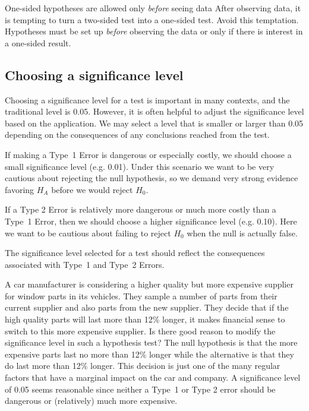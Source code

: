 \begin{caution}{One-sided hypotheses are allowed only \emph{before} seeing data}
{After observing data, it is tempting to turn a two-sided test into a one-sided test. Avoid this temptation. Hypotheses must be set up \emph{before} observing the data or only if there is interest in a one-sided result.}
\end{caution}


\subsection{Choosing a significance level}
\label{significanceLevel}


Choosing a significance level for a test is important in many contexts, and the traditional level is 0.05. However, it is often helpful to adjust the significance level based on the application. We may select a level that is smaller or larger than 0.05 depending on the consequences of any conclusions reached from the test.

If making a Type~1 Error is dangerous or especially costly, we should choose a small significance level (e.g. 0.01). Under this scenario we want to be very cautious about rejecting the null hypothesis, so we demand very strong evidence favoring $H_A$ before we would reject $H_0$.

If a Type 2 Error is relatively more dangerous or much more costly than a Type~1 Error, then we should choose a higher significance level (e.g. 0.10). Here we want to be cautious about failing to reject $H_0$ when the null is actually false.

\begin{tipBox}{
The significance level selected for a test should reflect the consequences associated with Type~1 and Type~2 Errors.}
\end{tipBox}

\begin{example}{A car manufacturer is considering a higher quality but more expensive supplier for window parts in its vehicles. They sample a number of parts from their current supplier and also parts from the new supplier. They decide that if the high quality parts will last more than 12\% longer, it makes financial sense to switch to this more expensive supplier. Is there good reason to modify the significance level in such a hypothesis test?}
The null hypothesis is that the more expensive parts last no more than 12\% longer while the alternative is that they do last more than 12\% longer. This decision is just one of the many regular factors that have a marginal impact on the car and company. A significance level of 0.05 seems reasonable since neither a Type~1 or Type 2 error should be dangerous or (relatively) much more expensive.
\end{example}

